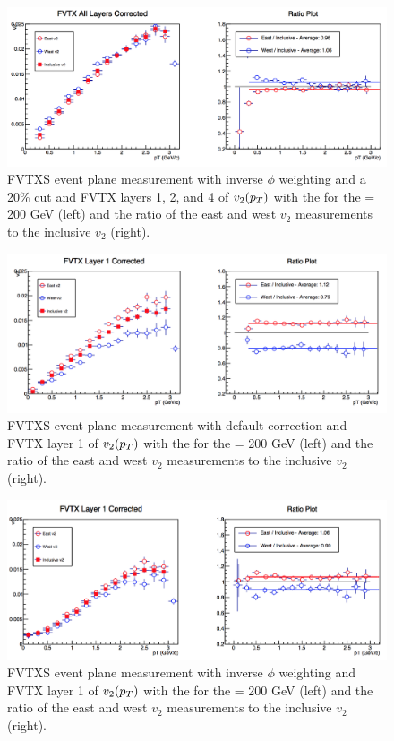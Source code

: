 \begin{figure}
\centering
\includegraphics[width=0.65\linewidth]{figs/fvtx_all_data_cut.png}
\caption{FVTXS event plane measurement with inverse $\phi$ weighting and a 20\% cut and FVTX layers 1, 2, and 4 of $v_{2}(\mbox{$p_T$})$ with the  for the \pau \sqsn = 200 GeV (left) and the ratio of the east and west $v_2$ measurements to the inclusive $v_2$ (right).}
\end{figure}

\begin{figure}
\centering
\includegraphics[width=0.65\linewidth]{figs/fvtx_1_default.png}
\caption{FVTXS event plane measurement with default correction and FVTX layer 1 of $v_{2}(\mbox{$p_T$})$ with the  for the \pau \sqsn = 200 GeV (left) and the ratio of the east and west $v_2$ measurements to the inclusive $v_2$ (right).}
\end{figure}

\begin{figure}
\centering
\includegraphics[width=0.65\linewidth]{figs/fvtx_1_data.png}
\caption{FVTXS event plane measurement with inverse $\phi$ weighting and FVTX layer 1 of $v_{2}(\mbox{$p_T$})$ with the  for the \pau \sqsn = 200 GeV (left) and the ratio of the east and west $v_2$ measurements to the inclusive $v_2$ (right).}
\end{figure}

